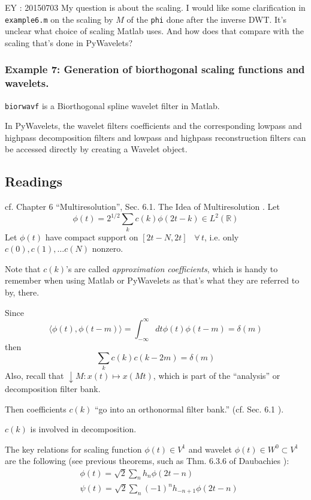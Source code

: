 \documentclass[twoside]{amsart}
\theoremstyle{plain}
\theoremstyle{definition}
\theoremstyle{remark}
\numberwithin{equation}{section}
\begin{document}
EY : 20150703 My question is about the scaling.  I would like some clarification in \verb|example6.m| on the scaling by $M$ of the \verb|phi| done after the inverse DWT.  It's unclear what choice of scaling Matlab uses.  And how does that compare with the scaling that's done in PyWavelets?  

\subsubsection*{Example 7: Generation of biorthogonal scaling functions and wavelets.}

\verb|biorwavf| is a Biorthogonal spline wavelet filter in Matlab.  

In PyWavelets, the wavelet filters coefficients and the corresponding lowpass and highpass decomposition filters and lowpass and highpass reconstruction filters can be accessed directly by creating a Wavelet object.

\subsection{Readings}\label{SubS:Readings_Handout10}

cf. Chapter 6 ``Multiresolution'', Sec. 6.1. The Idea of Multiresolution \cite{GStrangTNguyen1996}.  
Let 
\[
\phi(t) = 2^{1/2} \sum_k c(k) \phi(2t-k) \in L^2(\mathbb{R})
\]
Let $\phi(t)$ have compact support on $[2t-N,2t]$ \, $\forall \, t$, i.e. only $c(0), c(1), \dots c(N)$ nonzero.  

Note that $c(k)$'s are called \emph{approximation coefficients}, which is handy to remember when using Matlab or PyWavelets as that's what they are referred to by, there.  

Since 
\[
\langle \phi(t) , \phi(t-m) \rangle = \int_{-\infty}^{\infty}dt \phi(t) \phi(t-m) = \delta(m)
\]
then
\[
\sum_k c(k)c(k-2m) = \delta(m)
\]
Also, recall that $\downarrow M : x(t) \mapsto x(Mt)$, which is part of the ``analysis'' or decomposition filter bank.  

Then coefficients $c(k)$ ``go into an orthonormal filter bank.'' (cf. Sec. 6.1 \cite{GStrangTNguyen1996}).  

$c(k)$ is involved in decomposition.  

The key relations for scaling function $\phi(t) \in V^1$ and wavelet $\phi(t) \in W^0 \subset V^1$ are the following (see previous theorems, such as Thm. 6.3.6 of Daubachies \cite{IDaubechies1992}):
\begin{equation}
\begin{aligned}
  & \phi(t) = \sqrt{2} \sum_n h_n \phi(2t-n) \\ 
  & \psi(t) = \sqrt{2} \sum_n (-1)^n h_{-n+1} \phi(2t-n)
\end{aligned}
\end{equation}
\end{document}
